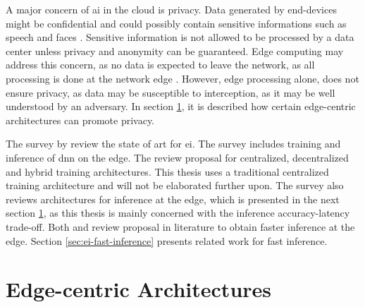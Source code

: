 A major concern of \gls{ai} in the cloud is privacy. Data generated by end-devices might be confidential and could possibly contain sensitive informations such as speech and faces \cite{chen_deep_2019}. Sensitive information is not allowed to be processed by a data center unless privacy and anonymity can be guaranteed. Edge computing may address this concern, as no data is expected to leave the network, as all processing is done at the network edge \cite{chen_deep_2019}. However, edge processing alone, does not ensure privacy, as data may be susceptible to interception, as it may be well understood by an adversary. In section \ref{sec:ei-architecture}, it is described how certain edge-centric architectures can promote privacy. 
 
The survey  by \citet{zhou_edge_2019} review the state of art for \gls{ei}. The survey includes training and inference of \gls{dnn} on the edge. The review proposal for centralized, decentralized and hybrid training architectures. This thesis uses a traditional centralized training architecture and will not be elaborated further upon. The survey also reviews architectures for inference at the edge, which is presented in the next section \ref{sec:ei-architecture}, as this thesis is mainly concerned with the inference accuracy-latency trade-off. Both \cite{zhou_edge_2019} and \cite{chen_deep_2019} review proposal in literature to obtain faster inference at the edge. Section \ref{sec:ei-fast-inference} presents related work for fast inference. 

\newpage
\section{Edge-centric Architectures} \label{sec:ei-architecture}

